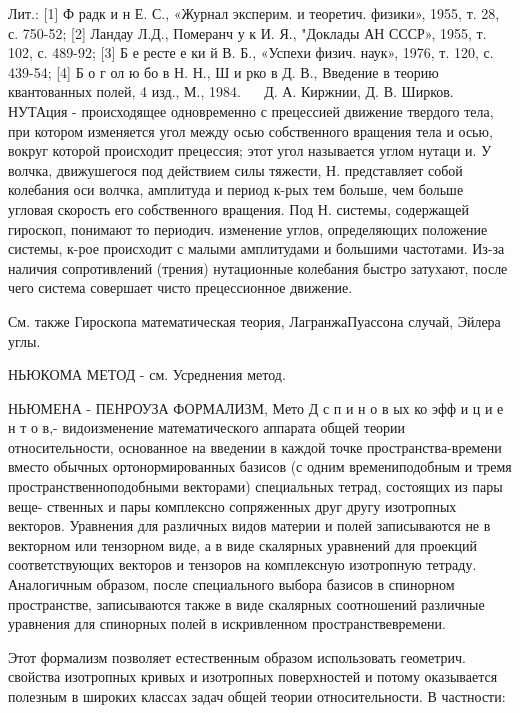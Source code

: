 \documentclass[10pt]{article}
\begin{document}
Лит.: [1] Ф радк и н Е. С., «Журнал эксперим. и теоретич. физики», 1955, т. 28, с. 750-52; [2] Ландау Л.Д., Померанч у к И. Я., "Доклады АН СССР», 1955, т. 102, с. 489-92; [3] Б е ресте е ки й В. Б., «Успехи физич. наук», 1976, т. 120, с. 439-54; [4] Б о г ол ю бо в Н. Н., Ш и рко в Д. В., Введение в теорию квантованных полей, 4 изд., М., 1984. $\quad$ Д. А. Киржнии, Д. В. Ширков. НУТАция - происходящее одновременно с прецессией движение твердого тела, при котором изменяется угол между осью собственного вращения тела и осью, вокруг которой происходит прецессия; этот угол называется углом нутаци и. У волчка, движушегося под действием силы тяжести, Н. представляет собой колебания оси волчка, амплитуда и период к-рых тем больше, чем больше угловая скорость его собственного вращения. Под Н. системы, содержащей гироскоп, понимают то периодич. изменение углов, определяющих положение системы, к-рое происходит с малыми амплитудами и большими частотами. Из-за наличия сопротивлений (трения) нутационные колебания быстро затухают, после чего система совершает чисто прецессионное движение.



См. также Гироскопа математическая теория, ЛагранжаПуассона случай, Эйлера углы.



НЬЮКОМА МЕТОД - см. Усреднения метод.



НЬЮМЕНА - ПЕНРОУЗА ФОРМАЛИЗМ, Мето Д с п и н о в ых ко эфф и ц и е н т о в,- видоизменение математического аппарата общей теории относительности, основанное на введении в каждой точке пространства-времени вместо обычных ортонормированных базисов (с одним времениподобным и тремя пространственноподобными векторами) специальных тетрад, состоящих из пары веще- ственных и пары комплексно сопряженных друг другу изотропных векторов. Уравнения для различных видов материи и полей записываются не в векторном или тензорном виде, а в виде скалярных уравнений для проекций соответствующих векторов и тензоров на комплексную изотропную тетраду. Аналогичным образом, после специального выбора базисов в спинорном пространстве, записываются также в виде скалярных соотношений различные уравнения для спинорных полей в искривленном пространствевремени.



Этот формализм позволяет естественным образом использовать геометрич. свойства изотропных кривых и изотропных поверхностей и потому оказывается полезным в широких классах задач общей теории относительности. В частности:
\end{document}
